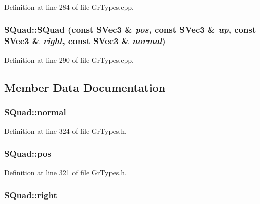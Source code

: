 Definition at line 284 of file GrTypes.cpp.\hypertarget{struct_s_quad_213663863728b94e666265602edf86a2}{
\subsubsection[{SQuad}]{\setlength{\rightskip}{0pt plus 5cm}SQuad::SQuad (const {\bf SVec3} \& {\em pos}, \/  const {\bf SVec3} \& {\em up}, \/  const {\bf SVec3} \& {\em right}, \/  const {\bf SVec3} \& {\em normal})}}
\label{struct_s_quad_213663863728b94e666265602edf86a2}




Definition at line 290 of file GrTypes.cpp.

\subsection{Member Data Documentation}
\hypertarget{struct_s_quad_60aeb05592b2d9a7dce3cfeb75eaea1a}{
\subsubsection[{normal}]{ {\bf SQuad::normal}}}
\label{struct_s_quad_60aeb05592b2d9a7dce3cfeb75eaea1a}




Definition at line 324 of file GrTypes.h.\hypertarget{struct_s_quad_a7639631bb91c54199f9c3d6a6392d9a}{
\subsubsection[{pos}]{ {\bf SQuad::pos}}}
\label{struct_s_quad_a7639631bb91c54199f9c3d6a6392d9a}




Definition at line 321 of file GrTypes.h.\hypertarget{struct_s_quad_a7f1aa0ce1dd6db386db3798636e15ea}{
\subsubsection[{right}]{ {\bf SQuad::right}}}
\label{struct_s_quad_a7f1aa0ce1dd6db386db3798636e15ea}




